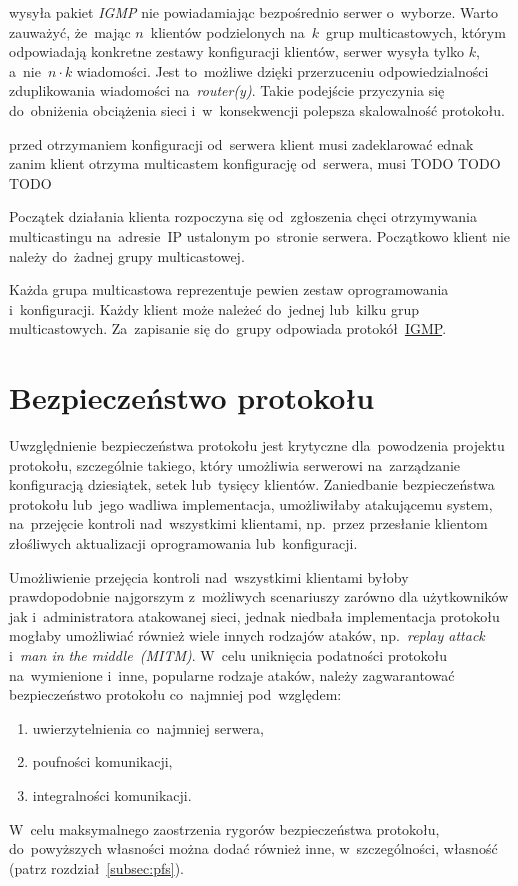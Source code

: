 \documentclass[thesis]{subfiles}
\begin{document}
 wysyła pakiet \emph{IGMP} nie powiadamiając bezpośrednio serwer o~wyborze. Warto zauważyć, że~mając $n$~klientów podzielonych na~$k$~grup multicastowych, którym odpowiadają konkretne zestawy konfiguracji klientów, serwer wysyła tylko $k$, a~nie~$n\cdot k$ wiadomości. Jest to~możliwe dzięki przerzuceniu odpowiedzialności zduplikowania wiadomości na~\emph{router(y)}. Takie podejście przyczynia się do~obniżenia obciążenia sieci i~w~konsekwencji polepsza skalowalność protokołu.

przed otrzymaniem konfiguracji od~serwera klient musi zadeklarować ednak zanim klient otrzyma multicastem konfigurację od~serwera, musi TODO TODO TODO

Początek działania klienta rozpoczyna się od~zgłoszenia chęci otrzymywania multicastingu na~adresie~IP ustalonym po~stronie serwera. Początkowo klient nie należy do~żadnej grupy multicastowej.

Każda grupa multicastowa reprezentuje pewien zestaw oprogramowania i~konfiguracji. Każdy klient może należeć do~jednej lub~kilku grup multicastowych. Za~zapisanie się do~grupy odpowiada protokół~\href{https://en.wikipedia.org/wiki/Internet_Group_Management_Protocol}{IGMP}.


\section{Bezpieczeństwo protokołu}
\label{sec:security}

Uwzględnienie bezpieczeństwa protokołu jest krytyczne dla~powodzenia projektu protokołu, szczególnie takiego, który umożliwia serwerowi na~zarządzanie konfiguracją dziesiątek, setek lub~tysięcy klientów. Zaniedbanie bezpieczeństwa protokołu lub~jego wadliwa implementacja, umożliwiłaby atakującemu system, na~przejęcie kontroli nad~wszystkimi klientami, np.~przez przesłanie klientom złośliwych aktualizacji oprogramowania lub~konfiguracji.

Umożliwienie przejęcia kontroli nad~wszystkimi klientami byłoby prawdopodobnie najgorszym z~możliwych scenariuszy zarówno dla użytkowników jak i~administratora atakowanej sieci, jednak niedbała implementacja protokołu mogłaby umożliwiać również wiele innych rodzajów ataków, np.~\emph{replay attack} i~\emph{man in the middle~(MITM)}. W~celu uniknięcia podatności protokołu na~wymienione i~inne, popularne rodzaje ataków, należy zagwarantować bezpieczeństwo protokołu co~najmniej pod~względem:
\begin{enumerate}
\item uwierzytelnienia co~najmniej serwera,
\item poufności komunikacji,
\item integralności komunikacji.
\end{enumerate}
W~celu maksymalnego zaostrzenia rygorów bezpieczeństwa protokołu, do~powyższych własności można dodać również inne, w~szczególności, własność \emph{} (patrz rozdział~\ref{subsec:pfs}).
\end{document}
